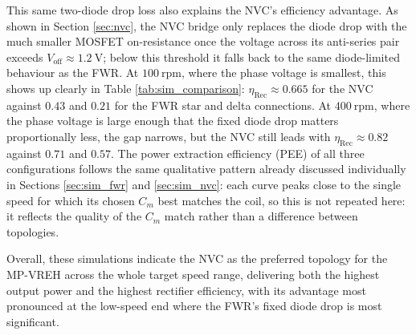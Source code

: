 This same two-diode drop loss also explains the NVC's efficiency advantage. As shown in Section \ref{sec:nvc}, the NVC bridge only replaces the diode drop with the much smaller MOSFET on-resistance once the voltage across its anti-series pair exceeds $V_\text{off}\approx1.2\ \text{V}$; below this threshold it falls back to the same diode-limited behaviour as the FWR. At $100\ \text{rpm}$, where the phase voltage is smallest, this shows up clearly in Table \ref{tab:sim_comparison}: $\eta_\text{Rec}\approx0.665$ for the NVC against $0.43$ and $0.21$ for the FWR star and delta connections. At $400\ \text{rpm}$, where the phase voltage is large enough that the fixed diode drop matters proportionally less, the gap narrows, but the NVC still leads with $\eta_\text{Rec}\approx0.82$ against $0.71$ and $0.57$. The power extraction efficiency (PEE) of all three configurations follows the same qualitative pattern already discussed individually in Sections \ref{sec:sim_fwr} and \ref{sec:sim_nvc}: each curve peaks close to the single speed for which its chosen $C_m$ best matches the coil, so this is not repeated here: it reflects the quality of the $C_m$ match rather than a difference between topologies.

Overall, these simulations indicate the NVC as the preferred topology for the MP-VREH across the whole target speed range, delivering both the highest output power and the highest rectifier efficiency, with its advantage most pronounced at the low-speed end where the FWR's fixed diode drop is most significant.
